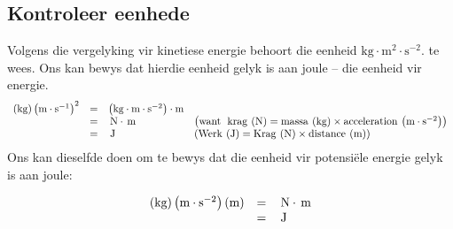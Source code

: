             \subsection*{Kontroleer eenhede}
            \nopagebreak
        \label{m38785*id67277}Volgens die vergelyking vir kinetiese energie behoort die eenheid $\text{kg}\ensuremath{\cdot}\text{m}{}^{2}\ensuremath{\cdot}\text{s}{}^{-2}$. te wees. Ons kan bewys dat hierdie eenheid gelyk is aan joule – die eenheid vir energie. 
        \label{m38785*id67329}\nopagebreak\noindent{}
    \begin{equation}
    \begin{array}{cccc}\hfill \left(\text{kg}\right){\left(\text{m}\ensuremath{\cdot}{\text{s}}^{-1}\right)}^{2}& =& \left(\text{kg}\ensuremath{\cdot}\text{m}\ensuremath{\cdot}{\text{s}}^{-2}\right)\ensuremath{\cdot}\text{m}\hfill & \\ & =& \phantom{\rule{0.166667em}{0ex}}\text{N}\ensuremath{\cdot}\phantom{\rule{0.166667em}{0ex}}\text{m}\hfill & \left(\text{want\; krag}\phantom{\rule{2pt}{0ex}}\left(\text{N}\right)=\text{massa}\phantom{\rule{2pt}{0ex}}\left(\text{kg}\right)\ensuremath{\times}\text{acceleration}\phantom{\rule{2pt}{0ex}}\left(\text{m}\ensuremath{\cdot}{\text{s}}^{-2}\right)\right)\hfill \\ & =& \phantom{\rule{0.166667em}{0ex}}\text{J}\hfill & \left(\text{Werk}\phantom{\rule{2pt}{0ex}}\left(\text{J}\right)=\text{Krag}\phantom{\rule{2pt}{0ex}}\left(\text{N}\right)\ensuremath{\times}\text{distance}\phantom{\rule{2pt}{0ex}}\left(\text{m}\right)\right)\hfill \end{array}
      \end{equation}
        \label{m38785*id67613}Ons kan dieselfde doen om te bewys dat die eenheid vir potensi\"{e}le energie gelyk is aan joule:\par 
        \label{m38785*id67619}\nopagebreak\noindent{}
          
    \begin{equation}
    \begin{array}{ccc}\hfill \left(\text{kg}\right)\left(\text{m}\ensuremath{\cdot}{\text{s}}^{-2}\right)\left(\text{m}\right)& =& \phantom{\rule{0.166667em}{0ex}}\text{N}\ensuremath{\cdot}\phantom{\rule{0.166667em}{0ex}}\text{m}\hfill \\ & =& \phantom{\rule{0.166667em}{0ex}}\text{J}\hfill \end{array}
      \end{equation}
\par
            \label{m38785*secfhsst!!!underscore!!!id1394}\vspace{.5cm} 


